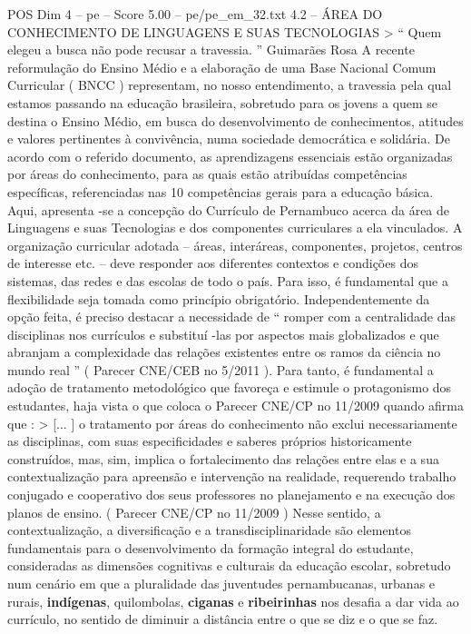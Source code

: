 \begin{textsample}{POS Dim 4 – pe – Score 5.00 – pe/pe\_em\_32.txt}  \label{ex:f4_pos_280}
4.2 – ÁREA DO CONHECIMENTO DE LINGUAGENS E SUAS TECNOLOGIAS > “ Quem elegeu a busca não pode recusar a travessia. ” Guimarães Rosa A recente reformulação do Ensino Médio e a elaboração de uma Base Nacional Comum Curricular ( BNCC ) representam, no nosso entendimento, a travessia pela qual estamos passando na educação brasileira, sobretudo para os jovens a quem se destina o Ensino Médio, em busca do desenvolvimento de conhecimentos, atitudes e valores pertinentes à convivência, numa sociedade democrática e solidária.
De acordo com o referido documento, as aprendizagens essenciais estão organizadas por áreas do conhecimento, para as quais estão atribuídas competências específicas, referenciadas nas 10 competências gerais para a educação básica.
Aqui, apresenta -se a concepção do Currículo de Pernambuco acerca da área de Linguagens e suas Tecnologias e dos componentes curriculares a ela vinculados.
A organização curricular adotada – áreas, interáreas, componentes, projetos, centros de interesse etc. – deve responder aos diferentes contextos e condições dos sistemas, das redes e das escolas de todo o país.
Para isso, é fundamental que a flexibilidade seja tomada como princípio obrigatório.
Independentemente da opção feita, é preciso destacar a necessidade de “ romper com a centralidade das disciplinas nos currículos e substituí -las por aspectos mais globalizados e que abranjam a complexidade das relações existentes entre os ramos da ciência no mundo real ” ( Parecer CNE/CEB no 5/2011 ).
Para tanto, é fundamental a adoção de tratamento metodológico que favoreça e estimule o protagonismo dos estudantes, haja vista o que coloca o Parecer CNE/CP no 11/2009 quando afirma que : > [... ] o tratamento por áreas do conhecimento não exclui necessariamente as disciplinas, com suas especificidades e saberes próprios historicamente construídos, mas, sim, implica o fortalecimento das relações entre elas e a sua contextualização para apreensão e intervenção na realidade, requerendo trabalho conjugado e cooperativo dos seus professores no planejamento e na execução dos planos de ensino. ( Parecer CNE/CP no 11/2009 ) Nesse sentido, a contextualização, a diversificação e a transdisciplinaridade são elementos fundamentais para o desenvolvimento da formação integral do estudante, consideradas as dimensões cognitivas e culturais da educação escolar, sobretudo num cenário em que a pluralidade das juventudes pernambucanas, urbanas e rurais, \textbf{indígenas}, quilombolas, \textbf{ciganas} e \textbf{ribeirinhas} nos desafia a dar vida ao currículo, no sentido de diminuir a distância entre o que se diz e o que se faz.

\end{textsample}
